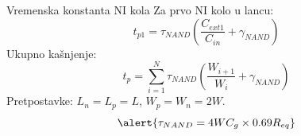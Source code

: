 \begin{frame}[label=09_3-s038]{Vremenska konstanta NI kola}
Za prvo NI kolo u lancu:\[t_{p1}=\tau_{NAND}\left(\frac{C_{ext1}}{C_{in}}+\gamma_{NAND}\right)\]
Ukupno kašnjenje:
\[t_p=\sum_{i=1}^N\tau_{NAND}\left(\frac{W_{i+1}}{W_i}+\gamma_{NAND}\right)\]
Pretpostavke: $L_n=L_p=L$, $W_p=W_n=2W$.
\[\alert{\tau_{NAND}=4WC_g\times0.69R_{eq}}\]
\end{frame}
